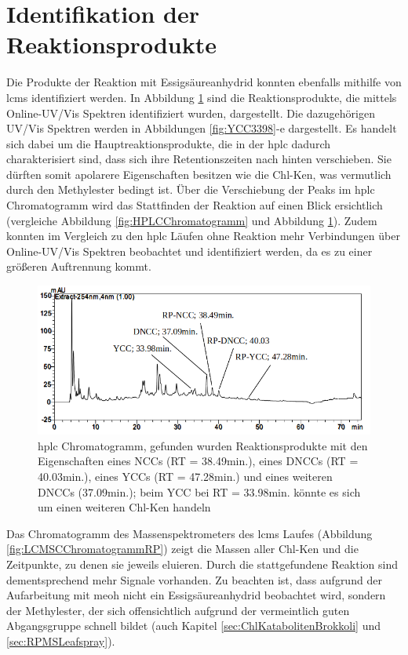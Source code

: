 \pagebreak
\section{Identifikation der Reaktionsprodukte}

Die Produkte der Reaktion mit Essigsäureanhydrid konnten ebenfalls mithilfe von \gls{lcms} identifiziert werden. In Abbildung \ref{fig:HPLCChromatogrammRP} sind die Reaktionsprodukte, die mittels Online-UV/Vis Spektren identifiziert wurden, dargestellt. Die dazugehörigen UV/Vis Spektren werden in Abbildungen \ref{fig:YCC3398}-e dargestellt. Es handelt sich dabei um die Hauptreaktionsprodukte, die in der \gls{hplc} dadurch charakterisiert sind, dass sich ihre Retentionszeiten nach hinten verschieben. Sie dürften somit apolarere Eigenschaften besitzen wie die \gls{Chl-K}en, was vermutlich durch den Methylester bedingt ist. Über die Verschiebung der Peaks im \gls{hplc} Chromatogramm wird das Stattfinden der Reaktion auf einen Blick ersichtlich (vergleiche Abbildung \ref{fig:HPLCChromatogramm} und Abbildung \ref{fig:HPLCChromatogrammRP}). Zudem konnten im Vergleich zu den \gls{hplc} Läufen ohne Reaktion mehr Verbindungen über Online-UV/Vis Spektren beobachtet und identifiziert werden, da es zu einer größeren Auftrennung kommt.

\begin{figure}[!htbp]
  \includegraphics[width=\textwidth]{figures/Kapitel6/Reaktion3h/HPLC_Chromatogramm.png}
  \caption[HPLC Chromatogramm nach 3h Reaktionsdauer, Quelle: Autor]{\gls{hplc} Chromatogramm, gefunden wurden Reaktionsprodukte mit den Eigenschaften eines NCCs (RT = 38.49min.), eines DNCCs (RT = 40.03min.), eines YCCs (RT = 47.28min.) und eines weiteren DNCCs (37.09min.); beim YCC bei RT = 33.98min. könnte es sich um einen weiteren \gls{Chl-K}en handeln}
  \label{fig:HPLCChromatogrammRP}
\end{figure}

Das Chromatogramm des Massenspektrometers des \gls{lcms} Laufes (Abbildung \ref{fig:LCMSCChromatogrammRP}) zeigt die Massen aller \gls{Chl-K}en und die Zeitpunkte, zu denen sie jeweils eluieren. Durch die stattgefundene Reaktion sind dementsprechend mehr Signale vorhanden. Zu beachten ist, dass aufgrund der Aufarbeitung mit \gls{meoh} nicht ein Essigsäureanhydrid beobachtet wird, sondern der Methylester, der sich offensichtlich aufgrund der vermeintlich guten Abgangsgruppe  schnell bildet (auch Kapitel \ref{sec:ChlKatabolitenBrokkoli} und \ref{sec:RPMSLeafspray}). \\

